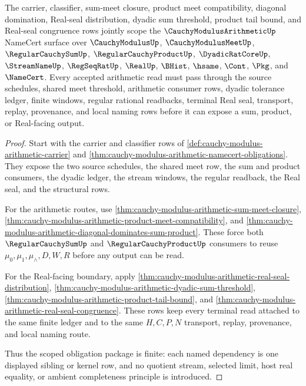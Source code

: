\begin{theorem}
\label{thm:cauchy-modulus-arithmetic-obligation-scope-package}
The carrier, classifier, sum-meet closure, product meet compatibility, diagonal domination, Real-seal distribution, dyadic sum threshold, product tail bound, and Real-seal congruence rows jointly scope the $\CauchyModulusArithmeticUp$ NameCert surface over $\CauchyModulusUp$, $\CauchyModulusMeetUp$, $\RegularCauchySumUp$, $\RegularCauchyProductUp$, $\DyadicRatCoreUp$, $\StreamNameUp$, $\RegSeqRatUp$, $\RealUp$, $\BHist$, $\hsame$, $\Cont$, $\Pkg$, and $\NameCert$. Every accepted arithmetic read must pass through the source schedules, shared meet threshold, arithmetic consumer rows, dyadic tolerance ledger, finite windows, regular rational readbacks, terminal Real seal, transport, replay, provenance, and local naming rows before it can expose a sum, product, or Real-facing output.
\end{theorem}
\begin{proof}
Start with the carrier and classifier rows of \autoref{def:cauchy-modulus-arithmetic-carrier} and \autoref{thm:cauchy-modulus-arithmetic-namecert-obligations}. They expose the two source schedules, the shared meet row, the sum and product consumers, the dyadic ledger, the stream windows, the regular readback, the Real seal, and the structural rows.

For the arithmetic routes, use \autoref{thm:cauchy-modulus-arithmetic-sum-meet-closure}, \autoref{thm:cauchy-modulus-arithmetic-product-meet-compatibility}, and \autoref{thm:cauchy-modulus-arithmetic-diagonal-dominates-sum-product}. These force both $\RegularCauchySumUp$ and $\RegularCauchyProductUp$ consumers to reuse $\mu_0,\mu_1,\mu_{\wedge},D,W,R$ before any output can be read.

For the Real-facing boundary, apply \autoref{thm:cauchy-modulus-arithmetic-real-seal-distribution}, \autoref{thm:cauchy-modulus-arithmetic-dyadic-sum-threshold}, \autoref{thm:cauchy-modulus-arithmetic-product-tail-bound}, and \autoref{thm:cauchy-modulus-arithmetic-real-seal-congruence}. These rows keep every terminal read attached to the same finite ledger and to the same $H,C,P,N$ transport, replay, provenance, and local naming route.

Thus the scoped obligation package is finite: each named dependency is one displayed sibling or kernel row, and no quotient stream, selected limit, host real equality, or ambient completeness principle is introduced.
\end{proof}

